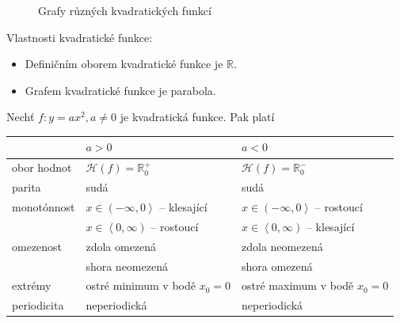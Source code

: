 \begin{figure}[ht!]
  \centering
  \caption{Grafy různých kvadratických funkcí}
\end{figure}

\begin{pozn}
Vlastnosti kvadratické funkce:
  \begin{itemize}
    \item Definičním oborem kvadratické funkce je $\mathbb R$.
    \item Grafem kvadratické funkce je parabola.
  \end{itemize}
\end{pozn}

\begin{veta}
  Nechť $f\colon y = ax^2, a \neq 0$ je kvadratická funkce. Pak platí
  \begin{center}
    \begin{tabularx}{\textwidth}{ l | l  l }
        \, & $a>0$ & $a<0$ \\
        \hline
        obor hodnot & $\mathcal H(f) = \mathbb R^{+}_0$ & $\mathcal H(f) = \mathbb R^{-}_0$ \\
        parita & sudá & sudá \\
        monotónnost & $x \in \left(-\infty, 0\right>$ -- klesající & $x \in \left(-\infty, 0\right>$ -- rostoucí \\
        \, & $x \in \left<  0, \infty \right)$ -- rostoucí & $x \in \left<  0, \infty \right)$ -- klesající \\
        omezenost & zdola omezená & zdola neomezená \\
        \, & shora neomezená & shora omezená \\
        extrémy &  ostré minimum v bodě $x_0=0$ & ostré maximum v bodě $x_0=0$ \\
        periodicita & neperiodická & neperiodická
    \end{tabularx}
  \end{center}
\end{veta}

